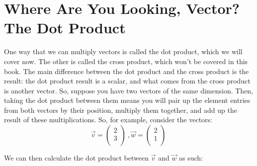 \documentclass[a4,12pt,twosided,openany]{memoir}
\begin{document}
\section{Where Are You Looking, Vector? The Dot Product}
One way that we can multiply vectors is called the dot product, which we will cover now. The other is called the cross product, which won’t be covered in this book. The main difference between the dot product and the cross product is the result: the dot product result is a scalar, and what comes from the cross product is another vector. So, suppose you have two vectors of the same dimension. Then, taking the dot product between them means you will pair up the element entries from both vectors by their position, multiply them together, and add up the result of these multiplications. So, for example, consider the vectors:
\[
\overrightarrow{v} = \begin{pmatrix}
 2\\
 3\\
\end{pmatrix}\ ,
\overrightarrow{w} = \begin{pmatrix}
 2\\
 1\\
\end{pmatrix}\ 
\]
\par 
\indent
We can then calculate the dot product between $\overrightarrow{v}$ and $\overrightarrow{w}$ as such:
\end{document}

